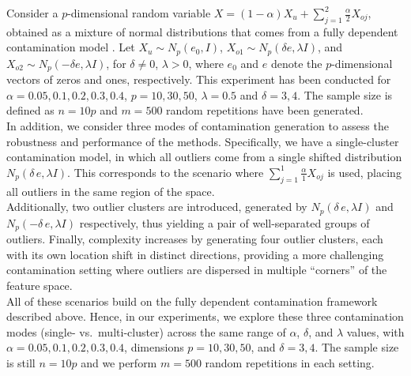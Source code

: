 \documentclass[12pt]{article}
\begin{document}
Consider a \( p \)-dimensional random variable \( X = (1 - \alpha)X_u + \sum_{j=1}^{2} \frac{\alpha}{2} X_{oj} \), obtained as a mixture of normal distributions that comes from a fully dependent contamination model \citep{Alqallaf2009}. Let \( X_u \sim N_p({e_0}, I) \), \( X_{o1} \sim N_p(\delta {e}, \lambda I) \), and \( X_{o2} \sim N_p(-\delta {e}, \lambda I) \), for \( \delta \neq 0 \), \( \lambda > 0 \), where \( {e_0} \) and \( {e} \) denote the \( p \)-dimensional vectors of zeros and ones, respectively. This experiment has been conducted for \( \alpha = 0.05, 0.1, 0.2, 0.3, 0.4 \), \( p = 10, 30, 50 \), \( \lambda = 0.5 \) and \( \delta = 3, 4 \). The sample size is defined as \( n = 10p \) and \( m = 500 \) random repetitions have been generated.\\

In addition, we consider three modes of contamination generation to assess the robustness and performance of the methods. Specifically, we have a single-cluster contamination model, in which all outliers come from a single shifted distribution \(N_p(\delta\,e,\lambda I)\). This corresponds to the scenario where \(\sum_{j=1}^{1}\frac{\alpha}{1} X_{oj}\) is used, placing all outliers in the same region of the space.\\

Additionally, two outlier clusters are introduced, generated by \(N_p(\delta\,e,\lambda I)\) and \(N_p(-\delta\,e,\lambda I)\) respectively, thus yielding a pair of well-separated groups of outliers. Finally,  complexity increases by generating four outlier clusters, each with its own location shift in distinct directions, providing a more challenging contamination setting where outliers are dispersed in multiple “corners” of the feature space.\\

All of these scenarios build on the fully dependent contamination framework described above. Hence, in our experiments, we explore these three contamination modes (single- vs.\ multi-cluster) across the same range of \(\alpha\), \(\delta\), and \(\lambda\) values, with \(\alpha = 0.05, 0.1, 0.2, 0.3, 0.4\), dimensions \(p=10, 30, 50\), and \(\delta = 3, 4\). The sample size is still \(n = 10p\) and we perform \(m=500\) random repetitions in each setting.\\[0.35em]
\end{document}
